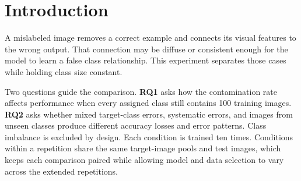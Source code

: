 \section{Introduction}
\label{sec:intro}

A mislabeled image removes a correct example and connects its visual features
to the wrong output. That connection may be diffuse or consistent enough for
the model to learn a false class relationship. This experiment separates those
cases while holding class size constant.

Two questions guide the comparison. \textbf{RQ1} asks how the contamination
rate affects performance when every assigned class still contains 100 training
images. \textbf{RQ2} asks whether mixed target-class errors, systematic errors,
and images from unseen classes produce different accuracy losses and error
patterns. Class imbalance is excluded by design. Each condition is trained ten
times. Conditions within a repetition share the same target-image pools and
test images, which keeps each comparison paired while allowing model and data
selection to vary across the extended repetitions.
